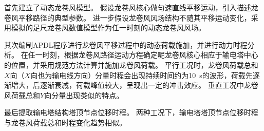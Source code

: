 首先建立了动态龙卷风模型。
假设龙卷风核心做匀速直线平移运动，引入描述龙卷风平移路径的典型参数。
进一步假设龙卷风风场结构不随其平移运动变化，采用模拟的足尺龙卷风数值模型作为任一时刻的动态龙卷风风场。

其次编制APDL程序进行龙卷风平移过程中的动态荷载施加，并进行动力时程分析。
在任一时刻，根据龙卷风路径运动方程确定呢龙卷风核心相应于输电塔中心的位置，并采用规范方法计算并施加龙卷风荷载。
平行工况时，龙卷风荷载总和$X$向（$X$向也为输电线方向）分量时程会出现持续时间约为\SI{10}{s}的波形，荷载先逐渐增大，后逐渐衰减，荷载峰值较大，呈现出一定的冲击效应。
垂直工况中龙卷风荷载总和$Y$向分量出现类似的特点。

最后提取输电塔结构塔顶节点位移时程。
两种工况下，输电塔塔顶节点位移时程与龙卷风荷载总和时程变化趋势相似。